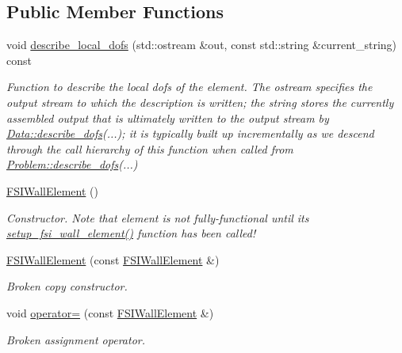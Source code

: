 \subsection*{Public Member Functions}
\begin{DoxyCompactItemize}
\item 
void \hyperlink{classoomph_1_1FSIWallElement_afe120348dddfc3acfd95e7d08c2d0a1d}{describe\+\_\+local\+\_\+dofs} (std\+::ostream \&out, const std\+::string \&current\+\_\+string) const
\begin{DoxyCompactList}\small\item\em Function to describe the local dofs of the element. The ostream specifies the output stream to which the description is written; the string stores the currently assembled output that is ultimately written to the output stream by \hyperlink{classoomph_1_1Data_a2dae16e2dcff9a40029f834c83364df5}{Data\+::describe\+\_\+dofs}(...); it is typically built up incrementally as we descend through the call hierarchy of this function when called from \hyperlink{classoomph_1_1Problem_abc103804eb319ae0b3d43870cc3e1eaf}{Problem\+::describe\+\_\+dofs}(...) \end{DoxyCompactList}\item 
\hyperlink{classoomph_1_1FSIWallElement_ae27388763fb781afa1d620fad111f234}{F\+S\+I\+Wall\+Element} ()
\begin{DoxyCompactList}\small\item\em Constructor. Note that element is not fully-\/functional until its \hyperlink{classoomph_1_1FSIWallElement_a487a050241512f3979c4d67bb40b2a63}{setup\+\_\+fsi\+\_\+wall\+\_\+element()} function has been called! \end{DoxyCompactList}\item 
\hyperlink{classoomph_1_1FSIWallElement_a57f70b2c656281853592a0163fa16268}{F\+S\+I\+Wall\+Element} (const \hyperlink{classoomph_1_1FSIWallElement}{F\+S\+I\+Wall\+Element} \&)
\begin{DoxyCompactList}\small\item\em Broken copy constructor. \end{DoxyCompactList}\item 
void \hyperlink{classoomph_1_1FSIWallElement_afd5fb80cc019327172d9f6fee416c0b1}{operator=} (const \hyperlink{classoomph_1_1FSIWallElement}{F\+S\+I\+Wall\+Element} \&)
\begin{DoxyCompactList}\small\item\em Broken assignment operator. \end{DoxyCompactList}\item 

\end{DoxyCompactItemize}
